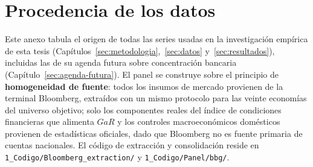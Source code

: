\chapter{Procedencia de los datos}
\label{chap:anexoA}

\noindent Este anexo tabula el origen de todas las series usadas en la investigación empírica
de esta tesis (Capítulos~\ref{sec:metodologia},~\ref{sec:datos} y~\ref{sec:resultados}), incluidas las de su agenda futura
sobre concentración bancaria (Capítulo~\ref{sec:agenda-futura}). El panel se construye sobre el
principio de \textbf{homogeneidad de fuente}: todos los insumos de mercado provienen de la
terminal Bloomberg, extraídos con un mismo protocolo para las veinte economías del universo
objetivo; solo los componentes reales del índice de condiciones financieras que alimenta
$GaR$ y los controles macroeconómicos domésticos provienen de estadísticas oficiales, dado
que Bloomberg no es fuente primaria de cuentas nacionales. El código de extracción y
consolidación reside en \texttt{1\_Codigo/Bloomberg\_extraction/} y \texttt{1\_Codigo/Panel/bbg/}.

\vspace{1em}

